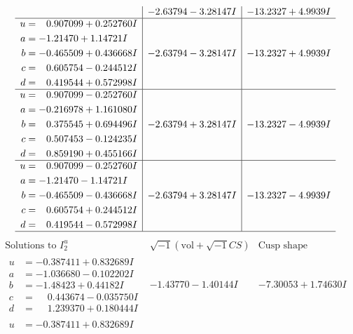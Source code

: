 \documentclass[1p]{elsarticle_modified}
\theoremstyle{definition}
\newcommand{\I}{\sqrt{-1}}
\begin{document}
$$\begin{array}{c|c|c}
 & -2.63794 - 3.28147 I & -13.2327 + 4.9939 I \\ \hline\begin{aligned}
u &= \phantom{-}0.907099 + 0.252760 I \\
a &= -1.21470 + 1.14721 I \\
b &= -0.465509 + 0.436668 I \\
c &= \phantom{-}0.605754 - 0.244512 I \\
d &= \phantom{-}0.419544 + 0.572998 I\end{aligned}
 & -2.63794 - 3.28147 I & -13.2327 + 4.9939 I \\ \hline\begin{aligned}
u &= \phantom{-}0.907099 - 0.252760 I \\
a &= -0.216978 + 1.161080 I \\
b &= \phantom{-}0.375545 + 0.694496 I \\
c &= \phantom{-}0.507453 - 0.124235 I \\
d &= \phantom{-}0.859190 + 0.455166 I\end{aligned}
 & -2.63794 + 3.28147 I & -13.2327 - 4.9939 I \\ \hline\begin{aligned}
u &= \phantom{-}0.907099 - 0.252760 I \\
a &= -1.21470 - 1.14721 I \\
b &= -0.465509 - 0.436668 I \\
c &= \phantom{-}0.605754 + 0.244512 I \\
d &= \phantom{-}0.419544 - 0.572998 I\end{aligned}
 & -2.63794 + 3.28147 I & -13.2327 - 4.9939 I\\
 \hline 
 \end{array}$$\newpage$$\begin{array}{c|c|c}  
\text{Solutions to }I^u_{2}& \I (\text{vol} + \sqrt{-1}CS) & \text{Cusp shape}\\
 \hline 
\begin{aligned}
u &= -0.387411 + 0.832689 I \\
a &= -1.036680 - 0.102202 I \\
b &= -1.48423 + 0.44182 I \\
c &= \phantom{-}0.443674 - 0.035750 I \\
d &= \phantom{-}1.239370 + 0.180444 I\end{aligned}
 & -1.43770 - 1.40144 I & -7.30053 + 1.74630 I \\ \hline\begin{aligned}
u &= -0.387411 + 0.832689 I \\

\end{aligned}
\end{array}$$
\end{document}
